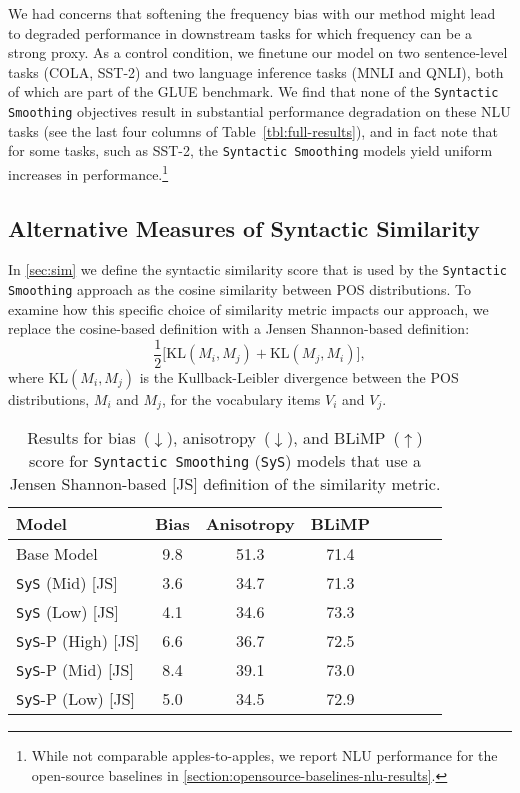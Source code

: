 We had concerns that softening the frequency bias with our method might lead to degraded performance in downstream tasks for which frequency can be a strong proxy. As a control condition, we finetune our model on two sentence-level tasks (COLA, SST-2) and two language inference tasks (MNLI and QNLI), both of which are part of the GLUE \citep{wang2018glue} benchmark. We find that none of the \texttt{Syntactic Smoothing} objectives result in substantial performance degradation on these NLU tasks (see the last four columns of Table~\cref{tbl:full-results}), and in fact note that for some tasks, such as SST-2, the \texttt{Syntactic Smoothing} models yield uniform increases in performance.\footnote{While not comparable apples-to-apples, we report NLU performance for the open-source baselines in \cref{section:opensource-baselines-nlu-results}.}  

\subsection{Alternative Measures of Syntactic Similarity}

In \cref{sec:sim} we define the syntactic similarity score that is used by the \texttt{Syntactic Smoothing} approach as the cosine similarity between POS distributions. To examine how this specific choice of similarity metric impacts our approach, we replace the cosine-based definition with a Jensen Shannon-based definition:
$$ \frac{1}{2}\big[ \text{KL}(M_i, M_j ) + \text{KL}(M_j, M_i)\big],$$
where KL$(M_i, M_j)$ is the Kullback-Leibler divergence between the POS distributions, $M_i$ and $M_j$, for the vocabulary items $V_i$ and $V_j$.

\begin{table}[t]
\centering
\small
\begin{tabular}{l||cc|ccccc}
\toprule
\textbf{Model}  &  \textbf{Bias}  & \textbf{Anisotropy} & \textbf{BLiMP} \\
\midrule
Base Model & 9.8 & 51.3 & 71.4  \\
\midrule
\texttt{SyS} (Mid) \hspace{0.42cm} [JS]  & 3.6 & 34.7 & 71.3 \\
\texttt{SyS} (Low) \hspace{0.38cm} [JS]  & 4.1 & 34.6 & 73.3  \\
\texttt{SyS}-P (High) \hspace{0.05cm} [JS] & 6.6 & 36.7  & 72.5  \\ 
\texttt{SyS}-P (Mid) \hspace{0.15cm} [JS] & 8.4 & 39.1 &  73.0 \\ 
\texttt{SyS}-P (Low) \hspace{0.12cm} [JS] & 5.0 &  34.5 & 72.9 \\ 
\bottomrule
\end{tabular}
\caption{\label{tbl:jsd-similarity-metric-results}
Results for bias~($\downarrow$), anisotropy~($\downarrow$), and BLiMP~($\uparrow$) score for \texttt{Syntactic Smoothing} (\texttt{SyS}) models that use a Jensen Shannon-based [JS] definition of the similarity metric.}
\end{table}


